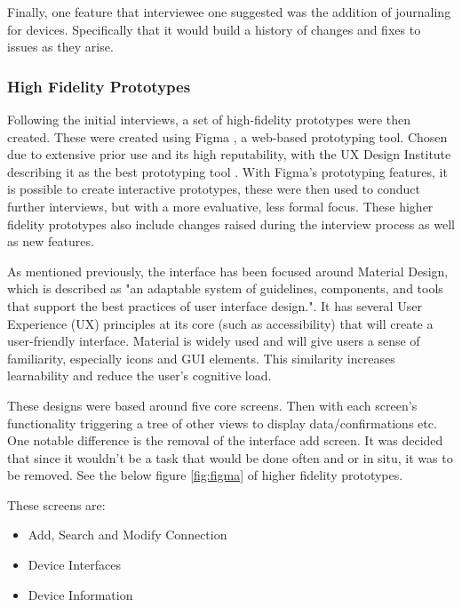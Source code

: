 \documentclass [11pt,a4paper]{article}
\begin{document}
Finally, one feature that interviewee one suggested was the addition of journaling for devices. Specifically that it would build a history of changes and fixes to issues as they arise. 


\subsubsection{High Fidelity Prototypes}
\label{sec:ui_design_high_fidelity_prototypes}

Following the initial interviews, a set of high-fidelity prototypes were then created. These were created using Figma \cite{figma}, a web-based prototyping tool. Chosen due to extensive prior use and its high reputability, with the UX Design Institute describing it as the best prototyping tool \cite{figmaUX}. With Figma's prototyping features, it is possible to create interactive prototypes, these were then used to conduct further interviews, but with a more evaluative, less formal focus. These higher fidelity prototypes also include changes raised during the interview process as well as new features.

As mentioned previously, the interface has been focused around Material Design, which is described as "an adaptable system of guidelines, components, and tools that support the best practices of user interface design."\cite{materialDesign}. It has several User Experience (UX) principles at its core (such as accessibility) that will create a user-friendly interface. Material is widely used and will give users a sense of familiarity, especially icons and GUI elements. This similarity increases learnability and reduce the user's cognitive load.

These designs were based around five core screens. Then with each screen's functionality triggering a tree of other views to display data/confirmations etc. One notable difference is the removal of the interface add screen. It was decided that since it wouldn't be a task that would be done often and or in situ, it was to be removed. See the below figure \ref{fig:figma} of higher fidelity prototypes. 

These screens are:
\begin{itemize}
    \item Add, Search and Modify Connection
    \item Device Interfaces
    \item Device Information
\end{itemize}
\end{document}
